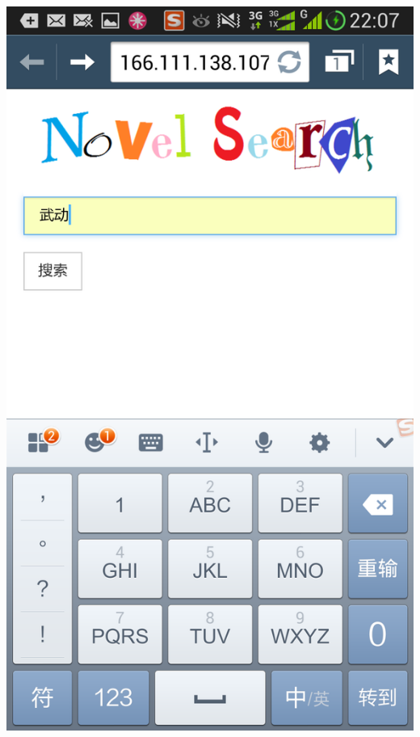 \documentclass[portrait,final,a1paper,fontscale=0.277]{baposter}
\begin{document}
\begin{poster}
{%
{\centering
\parbox[c]{0.49\linewidth}{\includegraphics[width=\linewidth]{images/search.png}\\}
}}
\end{poster}
\end{document}
